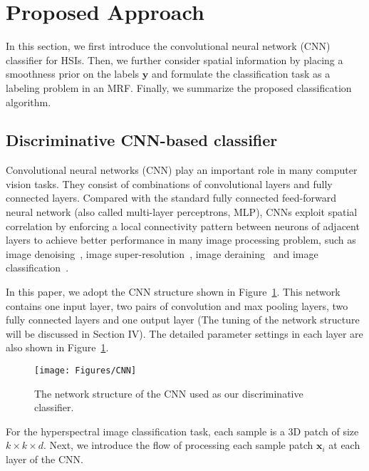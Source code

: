 \documentclass[journal]{IEEEtran}
\begin{document}
	\section{Proposed Approach}
	In this section, we first introduce the convolutional neural network (CNN) classifier for HSIs. Then, we further consider spatial information by placing a smoothness prior on the labels $\mathbf{y}$ and formulate the {{classification task}} as a labeling problem in an MRF. {{Finally, we summarize the proposed classification algorithm.}}
	
	\subsection{Discriminative CNN-based classifier}
	Convolutional neural networks (CNN) {{play an important role in many computer vision tasks.}} They consist of combinations of convolutional layers and fully connected layers. Compared with the standard fully connected feed-forward neural network (also called multi-layer perceptrons, MLP), CNNs exploit spatial correlation by enforcing a local connectivity pattern between neurons of adjacent layers to achieve better performance in many image processing problem, such as image denoising~\cite{xie2012image}, image super-resolution~\cite{dong2016image}, image deraining~\cite{fu2017clearing} and image classification~\cite{krizhevsky2012imagenet}.
	
	In this paper, we adopt the CNN structure shown in Figure~\ref{CNN}. This network contains one input layer, two pairs of convolution and max pooling layers, two fully connected layers and one output layer ({{The tuning of the network structure will be discussed in Section IV}}). The detailed parameter settings in each layer are also shown in Figure~\ref{CNN}.
	\begin{figure}
		\centering
		\texttt{[image: Figures/CNN]}
		\caption{The network structure of the CNN used as our discriminative classifier.}\label{CNN}
	\end{figure}
	For the hyperspectral image classification task, each sample is a 3D patch of size $k\times k \times d$. Next, we introduce the flow of processing each sample patch $\mathbf{x}_{i}$ at each layer of the CNN.
	
\end{document}
